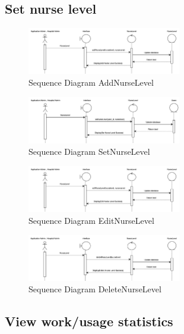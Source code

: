 \subsection{Set nurse level}

\begin{figure}[h]
    \centering
    \includegraphics[width=0.6\textwidth]{Sequence 10.1.png}
    \caption{Sequence Diagram AddNurseLevel}
    \end{figure}

    \begin{figure}[h]
    \centering
    \includegraphics[width=0.6\textwidth]{Sequence 10.2.png}
    \caption{Sequence Diagram SetNurseLevel}
    \end{figure}

    \begin{figure}[h]
    \centering
    \includegraphics[width=0.6\textwidth]{Sequence 10.3.png}
    \caption{Sequence Diagram EditNurseLevel}
    \end{figure}

    \begin{figure}[h]
    \centering
    \includegraphics[width=0.6\textwidth]{Sequence 10.4.png}
    \caption{Sequence Diagram DeleteNurseLevel}
    \end{figure}

\subsection{View work/usage statistics}

